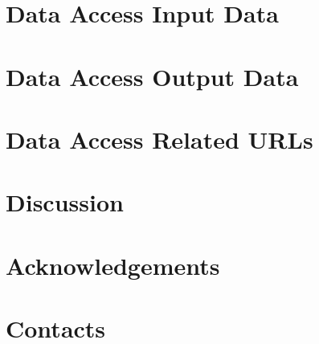 \section{Data Access Input Data}
\DataAccessInputData

\section{Data Access Output Data}
\DataAccessOutputData

\section{Data Access Related URLs}
\DataAccessRelatedUrls

\section{Discussion}
\Discussion

\section{Acknowledgements}
\Acknowledgements

\section{Contacts}
\Contacts





  
